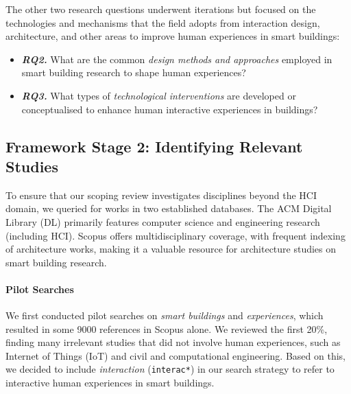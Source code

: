 The other two research questions underwent iterations but focused on the technologies and mechanisms that the field adopts from interaction design, architecture, and other areas to improve human experiences in smart buildings:  

\begin{itemize}
    \item \textbf{\textit{RQ2.}} What are the common \emph{design methods and approaches} employed in smart building research to shape human experiences? 
    \item \textbf{\textit{RQ3.}} What types of \emph{technological interventions} are developed or conceptualised to enhance human interactive experiences in buildings?
\end{itemize}


\subsection{Framework Stage 2: Identifying Relevant Studies}
To ensure that our scoping review investigates disciplines beyond the HCI domain, we queried for works in two established databases. The ACM Digital Library (DL) primarily features computer science and engineering research (including HCI). Scopus offers multidisciplinary coverage, with frequent indexing of architecture works, making it a valuable resource for architecture studies on smart building research. 

\paragraph{Pilot Searches}
We first conducted pilot searches on \textit{smart buildings} and \textit{experiences}, which resulted in some 9000 references in Scopus alone. We reviewed the first 20\%, finding many irrelevant studies that did not involve human experiences, such as Internet of Things (IoT) and civil and computational engineering. Based on this, we decided to include \textit{interaction} (\texttt{interac*}) in our search strategy to refer to interactive human experiences in smart buildings.  



